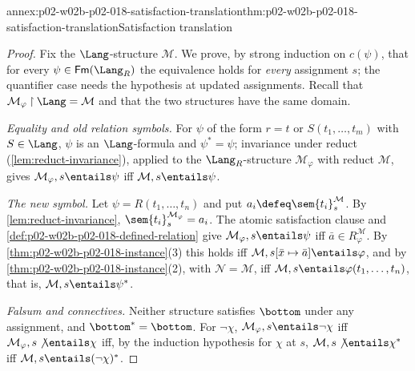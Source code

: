 \begin{annexitem}{annex:p02-w02b-p02-018-satisfaction-translation}{thm:p02-w02b-p02-018-satisfaction-translation}{Satisfaction translation}
\begin{proof}
Fix the \(\Lang\)-structure \(\mathcal M\).  We prove, by strong induction
on \(c(\psi)\), that for every \(\psi\in\mathsf{Fm}(\Lang_R)\) the
equivalence holds for \emph{every} assignment \(s\); the quantifier case
needs the hypothesis at updated assignments.  Recall that
\(\mathcal M_{\varphi}\mathbin{\upharpoonright}\Lang=\mathcal M\) and that
the two structures have the same domain.

\emph{Equality and old relation symbols.}  For \(\psi\) of the form
\(r=t\) or \(S(t_1,\ldots,t_m)\) with \(S\in\Lang\), \(\psi\) is an
\(\Lang\)-formula and \(\psi^{*}=\psi\); invariance under reduct
(\cref{lem:reduct-invariance}), applied to the \(\Lang_R\)-structure
\(\mathcal M_{\varphi}\) with reduct \(\mathcal M\), gives
\(\mathcal M_{\varphi},s\entails\psi\) iff \(\mathcal M,s\entails\psi\).

\emph{The new symbol.}  Let \(\psi=R(t_1,\ldots,t_n)\) and put
\(a_i\defeq\sem{t_i}^{\mathcal M}_s\).  By \cref{lem:reduct-invariance},
\(\sem{t_i}^{\mathcal M_{\varphi}}_s=a_i\).  The atomic satisfaction clause
and \cref{def:p02-w02b-p02-018-defined-relation} give
\(\mathcal M_{\varphi},s\entails\psi\) iff
\(\bar a\in R^{\mathcal M}_{\varphi}\).  By
\cref{thm:p02-w02b-p02-018-instance}(3) this holds iff
\(\mathcal M,s[\bar x\mapsto\bar a]\entails\varphi\), and by
\cref{thm:p02-w02b-p02-018-instance}(2), with \(\mathcal N=\mathcal M\),
iff \(\mathcal M,s\entails\varphi(t_1,\ldots,t_n)\), that is,
\(\mathcal M,s\entails\psi^{*}\).

\emph{Falsum and connectives.}  Neither structure satisfies \(\bottom\) under
any assignment, and \(\bottom^{*}=\bottom\).  For \(\neg\chi\),
\(\mathcal M_{\varphi},s\entails\neg\chi\) iff
\(\mathcal M_{\varphi},s\not\entails\chi\) iff, by the induction hypothesis
for \(\chi\) at \(s\), \(\mathcal M,s\not\entails\chi^{*}\) iff
\(\mathcal M,s\entails(\neg\chi)^{*}\).


\end{proof}
\end{annexitem}
